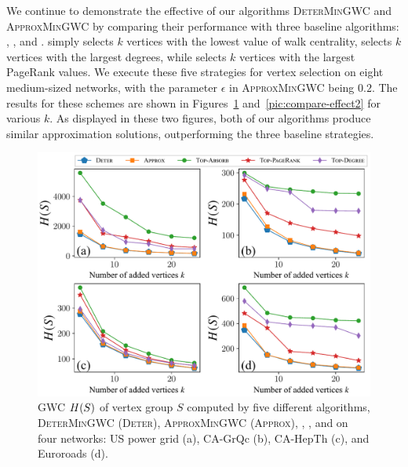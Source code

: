 \documentclass[10pt,twocolumn,twoside]{IEEEtran}
\begin{document}
We continue to demonstrate the effective of our algorithms \textsc{DeterMinGWC} and \textsc{ApproxMinGWC} by comparing their performance  with three baseline algorithms: , , and .  simply selects \(k\) vertices with the lowest value of walk centrality,  selects \(k\) vertices with the largest degrees, while  selects \(k\) vertices with the largest  PageRank values. We execute these five strategies for vertex selection on eight medium-sized networks, with the parameter $\epsilon$ in \textsc{ApproxMinGWC} being  \(0.2\). The results for these schemes are shown in Figures~\ref{pic:compare-effect1} and~\ref{pic:compare-effect2} for various $k$. As displayed in these two figures, both of our algorithms produce similar approximation solutions, outperforming the  three baseline strategies.

\begin{figure}[!t]
    \centering
    \includegraphics[width=\linewidth]{compare_effects_exact1.pdf}
    \caption{GWC \(H(S)\) of vertex group \(S\) computed by five different algorithms, \textsc{DeterMinGWC} (\textsc{Deter}), \textsc{ApproxMinGWC} (\textsc{Approx}), ,  , and    on four networks: US power grid (a), CA-GrQc (b), CA-HepTh (c), and Euroroads (d).\label{pic:compare-effect1}}
\end{figure}
\end{document}
